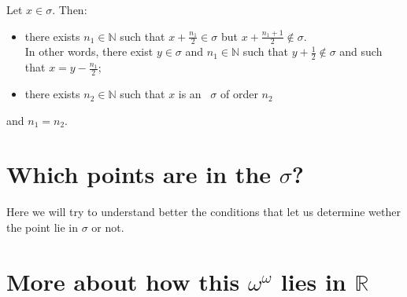 \begin{corollary}\label{predescors}
Let $x \in \sigma$. Then:
\begin{itemize}
\item there exists $n_1 \in \mathbb{N}$ such that $x + \frac{n_1}{2} \in \sigma$ 
but $x+\frac{n_1+1}{2} \not\in \sigma$. \\ In other words, there exist $y \in \sigma$ and 
$n_1 \in \mathbb{N}$ such that 
$y + \frac{1}{2} \not\in \sigma$ and such that $x = y - \frac{n_1}{2}$;
\item there exists $n_2 \in \mathbb{N}$ such that $x$ is an \apots\ $\sigma$ of 
order $n_2$
\end{itemize}
and $n_1 = n_2$.
\end{corollary}







\section{Which points are in the $\sigma$?}
Here we will try to understand better the conditions that let us determine wether the point 
lie in $\sigma$ or not.



\section{More about how this $\omega^\omega$ lies in $\mathbb{R}$}

